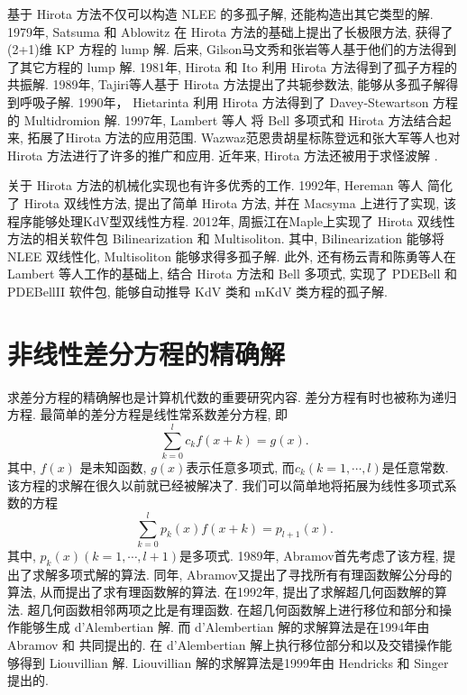 基于 Hirota 方法不仅可以构造 NLEE 的多孤子解, 还能构造出其它类型的解. 
1979年, Satsuma 和 Ablowitz\cite{satsuma1979two} 在 Hirota 方法的基础上提出了长极限方法, 获得了(2+1)维 KP 方程\cite{kadomtsev1970stability}的 lump 解. 后来, Gilson\cite{gilson1990lump}\D 马文秀\cite{ma2015lump}和张岩\cite{zhangYTSF,zhang2018m}等人基于他们的方法得到了其它方程的 lump 解.
1981年, Hirota 和 Ito \cite{hirota1983resonance}利用 Hirota 方法得到了孤子方程的共振解. 
1989年, Tajiri等人\cite{tajiri1989breather}基于 Hirota 方法提出了共轭参数法, 能够从多孤子解得到呼吸子解. 
1990年， Hietarinta \cite{hietarinta1990multidromion} 利用 Hirota 方法得到了 Davey-Stewartson 方程的 Multidromion 解. 
1997年, Lambert 等人\cite{gilson1996combinatorics,lambert1997construction} 将 Bell 多项式和 Hirota 方法结合起来, 拓展了Hirota 方法的应用范围. 
Wazwaz\cite{wazwaz2008multiple}\D 范恩贵\cite{fan2011new}\D 胡星标\cite{hu2002application}\D 陈登远\cite{chen2002novel}和张大军\cite{zhang2003n}等人也对 Hirota 方法进行了许多的推广和应用. 近年来, Hirota 方法还被用于求怪波解 \cite{guo2011rogue,sun2018general,zhaqilao2018symbolic}.

关于 Hirota 方法的机械化实现也有许多优秀的工作. 1992年, Hereman 等人\cite{hereman1992symbolic,hereman1991macsyma} 简化了 Hirota 双线性方法, 提出了简单 Hirota 方法, 并在 Macsyma 上进行了实现, 该程序能够处理KdV型双线性方程. 2012年, 周振江\cite{zhou2012}在Maple上实现了 Hirota 双线性方法的相关软件包 Bilinearization 和 Multisoliton. 其中, Bilinearization 能够将 NLEE 双线性化, Multisoliton 能够求得多孤子解. 此外, 还有杨云青和陈勇等人\cite{yang2011,miao2014pdebellii}在 Lambert 等人工作的基础上, 结合 Hirota 方法和 Bell 多项式, 实现了 PDEBell 和 PDEBellII 软件包, 能够自动推导 KdV 类和 mKdV 类方程的孤子解. 

\section{非线性差分方程的精确解}
求差分方程的精确解也是计算机代数的重要研究内容. 差分方程有时也被称为递归方程. 最简单的差分方程是线性常系数差分方程, 即
\begin{equation}
\sum_{k=0}^l{c_k f(x+k)}=g(x).
\label{ceq}
\end{equation}
其中, $f(x)$ 是未知函数, $g(x)$表示任意多项式, 而$c_k (k=1,\cdots,l)$是任意常数. 该方程的求解在很久以前就已经被解决了. 我们可以简单地将拓展为线性多项式系数的方程
\begin{equation}
\sum_{k=0}^l{p_k(x)f(x+k)=p_{l+1}(x)}.
\label{peq}
\end{equation}
其中, $p_k(x) (k=1,\cdots,l+1)$是多项式. 1989年, Abramov\cite{Abramov1989polynomial}首先考虑了该方程, 提出了求解多项式解的算法. 同年, Abramov\cite{Abramov1989rational}又提出了寻找所有有理函数解公分母的算法, 从而提出了求有理函数解的算法. 在1992年, \Petkovsek{}\cite{petkovvsek1992hypergeometric}提出了求解超几何函数解的算法. 超几何函数相邻两项之比是有理函数. 在超几何函数解上进行移位和部分和操作能够生成 d'Alembertian 解. 而 d'Alembertian 解的求解算法是在1994年由 Abramov 和 \Petkovsek{} \cite{abramov1994dAlembertian}共同提出的. 在 d'Alembertian 解上执行移位\D 部分和以及交错操作能够得到 Liouvillian 解. Liouvillian 解的求解算法是1999年由 Hendricks 和 Singer \cite{hendricks1999Liouvillian}提出的.


